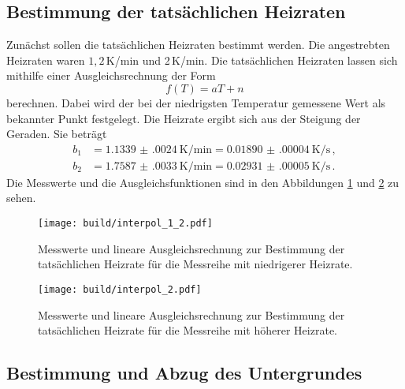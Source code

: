 \subsection{Bestimmung der tatsächlichen Heizraten}
\label{sec:heiz}
Zunächst sollen die tatsächlichen Heizraten bestimmt werden. Die angestrebten
Heizraten waren $1{,}2\,$K/min und 2\,K/min. Die tatsächlichen Heizraten lassen
sich mithilfe einer Ausgleichsrechnung der Form
\begin{equation*}
  f(T)=aT+n
\end{equation*}
berechnen. Dabei wird der bei der niedrigsten Temperatur gemessene Wert als bekannter
Punkt festgelegt. Die Heizrate ergibt sich aus der Steigung der Geraden. Sie beträgt
\begin{align*}
  b_1&=\SI{1.1339(0024)}{\kelvin\per\minute}= \SI{0.01890(00004)}{\kelvin\per\second}\,, \\
  b_2&=\SI{1.7587(0033)}{\kelvin\per\minute}= \SI{0.02931(00005)}{\kelvin\per\second}\,.
\end{align*}
Die Messwerte und die Ausgleichsfunktionen sind in den Abbildungen \ref{fig:heiz1}
und \ref{fig:heiz2} zu sehen.

\begin{figure}
  \centering
  \texttt{[image: build/interpol\_1\_2.pdf]}
  \caption{Messwerte und lineare Ausgleichsrechnung zur Bestimmung der tatsächlichen
  Heizrate für die Messreihe mit niedrigerer Heizrate.}
  \label{fig:heiz1}
\end{figure}
\begin{figure}
  \centering
  \texttt{[image: build/interpol\_2.pdf]}
  \caption{Messwerte und lineare Ausgleichsrechnung zur Bestimmung der tatsächlichen
  Heizrate für die Messreihe mit höherer Heizrate.}
  \label{fig:heiz2}
\end{figure}

\newpage
\subsection{Bestimmung und Abzug des Untergrundes}
\label{sec:untergrund}

